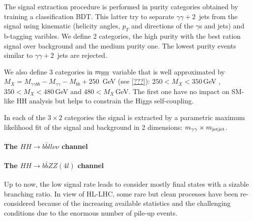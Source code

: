 The signal extraction procedure is performed in purity categories obtained by training a classification BDT. This latter try to separate $\gamma\gamma + 2$~jets from the signal using kinematic (helicity angles, $p_T$ and directions of the $\gamma$s and jets) and b-tagging varibles. We define 2 categories, the high purity with the best ration signal over background and the medium purity one. The lowest purity events similar to $\gamma\gamma + 2$~jets are rejected.

We also define 3 categories in $m_{\rm HH}$ variable that is well approximated by $M_{X} = M_{\gamma\gamma bb} - M_{\gamma\gamma} - M_{bb} + 250$~GeV (see \ref{???}): $250 < M_{X} < 350$\,GeV , $350 < M_{X} < 480$\,GeV and  $480 < M_{X}$\,GeV. The first one have no impact on SM-like HH analysis but helps to constrain the Higgs self-coupling.

In each of the $3 \times 2$ categories the signal is extracted by a parametric maximum likelihood fit of the signal and background in 2 dimensions: $m_{\gamma\gamma} \times m_{\rm jet jet}$.

\paragraph{The $HH \rightarrow b\bar{b}ll\nu\nu$ channel}



\paragraph{The $HH \rightarrow b\bar{b}ZZ(4l)$ channel}

Up to now, the low signal rate leads to consider mostly final states with a sizable branching ratio. In view of HL-LHC, some rare but clean processes have been re-considered because of the increasing available statistics and the challenging conditions due to the enormous number of pile-up events. 

